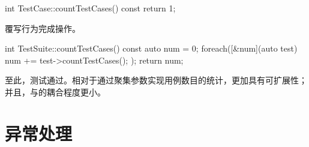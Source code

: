 \begin{content}
\begin{leftbar}
 \begin{c++}[caption={\ttfamily{src/mars/core/TestCase.cc}}]
int TestCase::countTestCases() const {
  return 1;
}
 \end{c++}
\end{leftbar}

覆写行为完成操作。

\begin{leftbar}
 \begin{c++}[caption={\ttfamily{src/mars/core/TestSuite.cc}}]
int TestSuite::countTestCases() const {
  auto num = 0;
  foreach([&num](auto test) {
    num += test->countTestCases();
  });
  return num;
}
 \end{c++}
\end{leftbar}

至此，测试通过。相对于通过聚集参数实现用例数目的统计，更加具有可扩展性；并且，与的耦合程度更小。

\end{content}

\section{异常处理}

